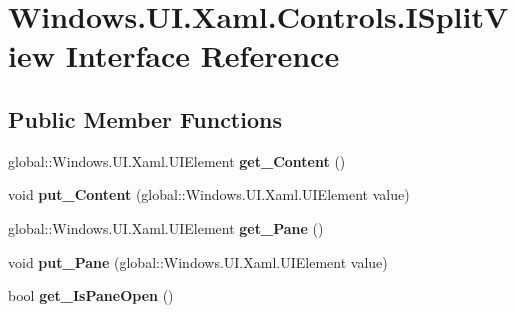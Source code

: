 \hypertarget{interface_windows_1_1_u_i_1_1_xaml_1_1_controls_1_1_i_split_view}{}\section{Windows.\+U\+I.\+Xaml.\+Controls.\+I\+Split\+View Interface Reference}
\label{interface_windows_1_1_u_i_1_1_xaml_1_1_controls_1_1_i_split_view}
\subsection*{Public Member Functions}
\begin{DoxyCompactItemize}
\item 
\mbox{\label{interface_windows_1_1_u_i_1_1_xaml_1_1_controls_1_1_i_split_view_ab894c1ae83bd61f588e1be844b3d9a6f}} 
global\+::\+Windows.\+U\+I.\+Xaml.\+U\+I\+Element {\bfseries get\+\_\+\+Content} ()
\item 
\mbox{\label{interface_windows_1_1_u_i_1_1_xaml_1_1_controls_1_1_i_split_view_a49750de7e2ee3bd1224af98270b5d354}} 
void {\bfseries put\+\_\+\+Content} (global\+::\+Windows.\+U\+I.\+Xaml.\+U\+I\+Element value)
\item 
\mbox{\label{interface_windows_1_1_u_i_1_1_xaml_1_1_controls_1_1_i_split_view_a20373a0e78a10fa6edcfbbb5fc28876f}} 
global\+::\+Windows.\+U\+I.\+Xaml.\+U\+I\+Element {\bfseries get\+\_\+\+Pane} ()
\item 
\mbox{\label{interface_windows_1_1_u_i_1_1_xaml_1_1_controls_1_1_i_split_view_ae154773362c08fdd390cae063a4a432d}} 
void {\bfseries put\+\_\+\+Pane} (global\+::\+Windows.\+U\+I.\+Xaml.\+U\+I\+Element value)
\item 
\mbox{\label{interface_windows_1_1_u_i_1_1_xaml_1_1_controls_1_1_i_split_view_a0d4584bb7eb3b5f27f459450b6bc13e2}} 
bool {\bfseries get\+\_\+\+Is\+Pane\+Open} ()
\item 
\mbox{\label{interface_windows_1_1_u_i_1_1_xaml_1_1_controls_1_1_i_split_view_a676e370b7973fc04fa22ea1c13c5b739}} 

\end{DoxyCompactItemize}
